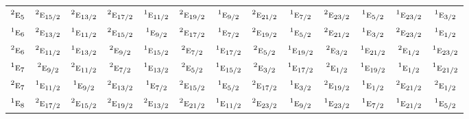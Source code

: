 \documentclass[10pt,a4paper]{article}
\numberwithin{equation}{section}
\newcommand{\irr}[1]{\text{\normalfont\scshape #1}}
\newcommand{\conjpair}[1]{{}^{#1}}
\begin{document}
{\begin{longtable}{@{}lcccccccccccc@{}}
$\conjpair{2}\irr{e}_{5}$ & $\conjpair{2}\irr{e}_{15/2}$ & $\conjpair{2}\irr{e}_{13/2}$ & $\conjpair{2}\irr{e}_{17/2}$ & $\conjpair{1}\irr{e}_{11/2}$ & $\conjpair{2}\irr{e}_{19/2}$ & $\conjpair{1}\irr{e}_{9/2}$ & $\conjpair{2}\irr{e}_{21/2}$ & $\conjpair{1}\irr{e}_{7/2}$ & $\conjpair{2}\irr{e}_{23/2}$ & $\conjpair{1}\irr{e}_{5/2}$ & $\conjpair{1}\irr{e}_{23/2}$ & $\conjpair{1}\irr{e}_{3/2}$\\
$\conjpair{1}\irr{e}_{6}$ & $\conjpair{2}\irr{e}_{13/2}$ & $\conjpair{1}\irr{e}_{11/2}$ & $\conjpair{2}\irr{e}_{15/2}$ & $\conjpair{1}\irr{e}_{9/2}$ & $\conjpair{2}\irr{e}_{17/2}$ & $\conjpair{1}\irr{e}_{7/2}$ & $\conjpair{2}\irr{e}_{19/2}$ & $\conjpair{1}\irr{e}_{5/2}$ & $\conjpair{2}\irr{e}_{21/2}$ & $\conjpair{1}\irr{e}_{3/2}$ & $\conjpair{2}\irr{e}_{23/2}$ & $\conjpair{1}\irr{e}_{1/2}$\\
$\conjpair{2}\irr{e}_{6}$ & $\conjpair{2}\irr{e}_{11/2}$ & $\conjpair{1}\irr{e}_{13/2}$ & $\conjpair{2}\irr{e}_{9/2}$ & $\conjpair{1}\irr{e}_{15/2}$ & $\conjpair{2}\irr{e}_{7/2}$ & $\conjpair{1}\irr{e}_{17/2}$ & $\conjpair{2}\irr{e}_{5/2}$ & $\conjpair{1}\irr{e}_{19/2}$ & $\conjpair{2}\irr{e}_{3/2}$ & $\conjpair{1}\irr{e}_{21/2}$ & $\conjpair{2}\irr{e}_{1/2}$ & $\conjpair{1}\irr{e}_{23/2}$\\
$\conjpair{1}\irr{e}_{7}$ & $\conjpair{2}\irr{e}_{9/2}$ & $\conjpair{2}\irr{e}_{11/2}$ & $\conjpair{2}\irr{e}_{7/2}$ & $\conjpair{1}\irr{e}_{13/2}$ & $\conjpair{2}\irr{e}_{5/2}$ & $\conjpair{1}\irr{e}_{15/2}$ & $\conjpair{2}\irr{e}_{3/2}$ & $\conjpair{1}\irr{e}_{17/2}$ & $\conjpair{2}\irr{e}_{1/2}$ & $\conjpair{1}\irr{e}_{19/2}$ & $\conjpair{1}\irr{e}_{1/2}$ & $\conjpair{1}\irr{e}_{21/2}$\\
$\conjpair{2}\irr{e}_{7}$ & $\conjpair{1}\irr{e}_{11/2}$ & $\conjpair{1}\irr{e}_{9/2}$ & $\conjpair{2}\irr{e}_{13/2}$ & $\conjpair{1}\irr{e}_{7/2}$ & $\conjpair{2}\irr{e}_{15/2}$ & $\conjpair{1}\irr{e}_{5/2}$ & $\conjpair{2}\irr{e}_{17/2}$ & $\conjpair{1}\irr{e}_{3/2}$ & $\conjpair{2}\irr{e}_{19/2}$ & $\conjpair{1}\irr{e}_{1/2}$ & $\conjpair{2}\irr{e}_{21/2}$ & $\conjpair{2}\irr{e}_{1/2}$\\
$\conjpair{1}\irr{e}_{8}$ & $\conjpair{2}\irr{e}_{17/2}$ & $\conjpair{2}\irr{e}_{15/2}$ & $\conjpair{2}\irr{e}_{19/2}$ & $\conjpair{2}\irr{e}_{13/2}$ & $\conjpair{2}\irr{e}_{21/2}$ & $\conjpair{1}\irr{e}_{11/2}$ & $\conjpair{2}\irr{e}_{23/2}$ & $\conjpair{1}\irr{e}_{9/2}$ & $\conjpair{1}\irr{e}_{23/2}$ & $\conjpair{1}\irr{e}_{7/2}$ & $\conjpair{1}\irr{e}_{21/2}$ & $\conjpair{1}\irr{e}_{5/2}$\\

\end{longtable}}
\end{document}
